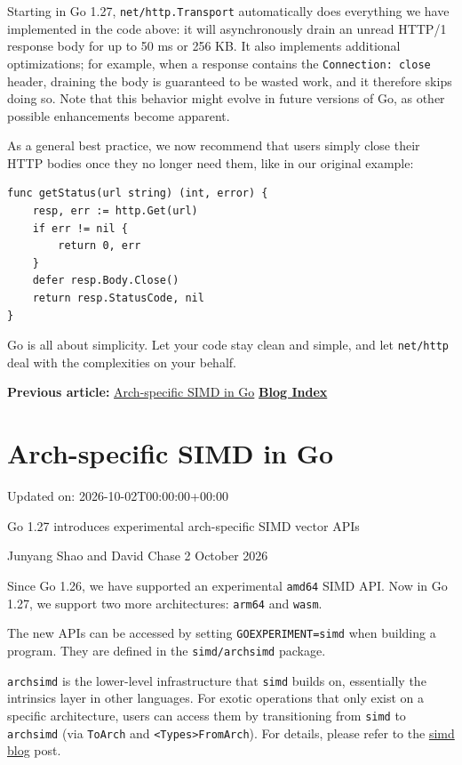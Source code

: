 \documentclass[11pt,a4paper]{article}
\begin{document}
Starting in Go 1.27, \texttt{net/http.Transport} automatically does everything we have implemented in the code above: it will asynchronously drain an unread HTTP/1 response body for up to 50 ms or 256 KB. It also implements additional optimizations; for example, when a response contains the \texttt{Connection: close} header, draining the body is guaranteed to be wasted work, and it therefore skips doing so. Note that this behavior might evolve in future versions of Go, as other possible enhancements become apparent.

As a general best practice, we now recommend that users simply close their HTTP bodies once they no longer need them, like in our original example:

\begin{verbatim}
func getStatus(url string) (int, error) {
    resp, err := http.Get(url)
    if err != nil {
        return 0, err
    }
    defer resp.Body.Close()
    return resp.StatusCode, nil
}
\end{verbatim}

Go is all about simplicity. Let your code stay clean and simple, and let \texttt{net/http} deal with the complexities on your behalf.

\textbf{Previous article:} \href{https://go.dev/blog/archsimd}{Arch-specific SIMD in Go} \href{https://go.dev/blog/all}{\textbf{Blog Index}}

\section{Arch-specific SIMD in Go}

Updated on: 2026-10-02T00:00:00+00:00

Go 1.27 introduces experimental arch-specific SIMD vector APIs

Junyang Shao and David Chase
2 October 2026

Since Go 1.26, we have supported an experimental \texttt{amd64} SIMD API. Now in Go 1.27, we support two more architectures: \texttt{arm64} and \texttt{wasm}.

The new APIs can be accessed by setting \texttt{GOEXPERIMENT=simd} when building a program. They are defined in the \texttt{simd/archsimd} package.

\texttt{archsimd} is the lower-level infrastructure that \texttt{simd} builds on, essentially the intrinsics layer in other languages. For exotic operations that only exist on a specific architecture, users can access them by transitioning from \texttt{simd} to \texttt{archsimd} (via \texttt{ToArch} and \texttt{<Types>FromArch}). For details, please refer to the \href{https://go.dev/blog/simd-experiment}{simd blog} post.
\end{document}
